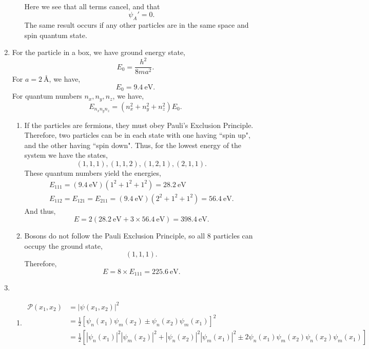 \documentclass[10pt]{article}
\begin{document}
\begin{enumerate}
\begin{enumerate}
\begin{multline*}
  \end{multline*}
  Here we see that all terms cancel, and that 
  \[
    \psi_A' = 0
  .\]
  The same result occurs if any other particles are in the same space and spin quantum state.
\end{enumerate}
\item
  For the particle in a box, we have ground energy state, 
  \[
    E_0 = \frac{h^2}{8ma^2}
  .\]
  For $ a=\qty{2}{\angstrom} $, we have,
  \[
    E_0=\qty{9.4}{\electronvolt}
  .\]
  For quantum numbers $ n_x,n_y,n_z $, we have,
  \[
    E_{n_xn_yn_z} = \left( n_x^2+n_y^2+n_z^2 \right) E_0 
  .\]
  \begin{enumerate}
  \item
    If the particles are fermions, they must obey Pauli's Exclusion Principle.
    Therefore, two particles can be in each state with one having ``spin up", and the other having ``spin down".
    Thus, for the lowest energy of the system we have the states,
    \[
      (1,1,1), (1,1,2), (1,2,1), (2,1,1)
    .\]
    These quantum numbers yield the energies,
    \begin{gather*}
      E_{111} = \left( \qty{9.4}{\electronvolt} \right) \left(1^2 + 1^2 + 1^2\right) = \qty{28.2}{\electronvolt} \\
      E_{112}=E_{121}=E_{211} = \left( \qty{9.4}{\electronvolt} \right) \left( 2^2+1^2+1^2 \right) = \qty{56.4}{\electronvolt}
    .\end{gather*}
    And thus,
    \[
      E=2 \left( \qty{28.2}{\electronvolt} + 3\times \qty{56.4}{\electronvolt} \right) = \qty{398.4}{\electronvolt}
    .\]
    \item
      Bosons do not follow the Pauli Exclusion Principle, so all 8 particles can occupy the ground state,
      \[
        (1,1,1)
      .\]
      Therefore,
      \[
        E=8\times E_{111} = \qty{225.6}{\electronvolt}
      .\]
  \end{enumerate}
\item
  \begin{enumerate}
  \item 
    \begin{align*}
      \mathcal{P} \left( x_1,x_2 \right) &= \left| \psi \left( x_1,x_2 \right) \right|^2 \\
                                     &= \frac{1}{2} \left[ \psi_n \left( x_1 \right) \psi_m \left( x_2 \right) \pm \psi_n \left( x_2 \right) \psi_m \left( x_1 \right) \right]^2 \\
                                     &= \frac{1}{2} \left[ \left|\psi_n \left( x_1 \right) \right| ^2 \left| \psi_m \left( x_2 \right) \right| ^2 + \left| \psi_n \left( x_2 \right) \right| ^2 \left| \psi_m \left( x_1 \right) \right| ^2 \pm 2 \psi_n \left( x_1 \right) \psi_m \left( x_2 \right) \psi_n \left( x_2 \right) \psi_m \left( x_1 \right) \right]

\end{align*}
\end{enumerate}
\end{enumerate}
\end{document}
